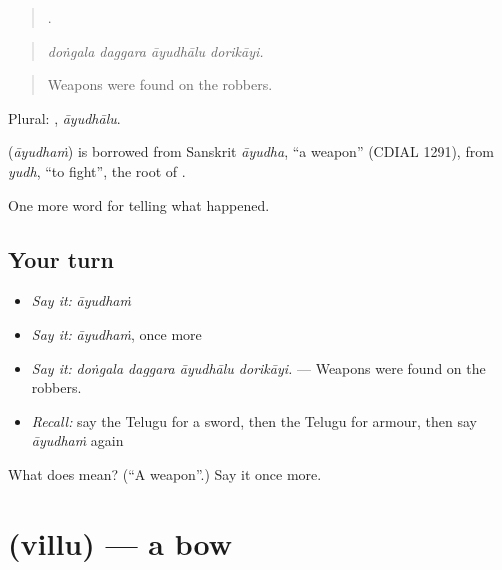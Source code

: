 \begin{quote}
   .
\end{quote}

\begin{quote}
\emph{doṅgala daggara āyudhālu dorikāyi.}
\end{quote}

\begin{quote}
Weapons were found on the robbers.
\end{quote}

Plural: , \emph{āyudhālu}.

\begin{cousinweb}
\textbf{} (\emph{āyudhaṁ}) is borrowed from Sanskrit \emph{āyudha}, \textquotedblleft{}a weapon\textquotedblright{} (CDIAL 1291), from \emph{yudh}, \textquotedblleft{}to fight\textquotedblright{}, the root of .
\end{cousinweb}

\begin{grammarlens}[title={What you've built}]
One more word for telling what happened.
\end{grammarlens}

\subsection*{Your turn}
\begin{itemize}
\raggedright
  \item \emph{Say it:} \emph{āyudhaṁ}
  \item \emph{Say it:} \emph{āyudhaṁ}, once more
  \item \emph{Say it:} \emph{doṅgala daggara āyudhālu dorikāyi.} — Weapons were found on the robbers.
  \item \emph{Recall:} say the Telugu for a sword, then the Telugu for armour, then say \emph{āyudhaṁ} again
\end{itemize}

\begin{tcolorbox}[breakable,colback=teal!4,colframe=teal!35!black,title={Before you move on}]
What does  mean? (\textquotedblleft{}A weapon\textquotedblright{}.) Say it once more.
\end{tcolorbox}
\section[\texorpdfstring{\te{విల్లు} (villu)}{విల్లు (villu)}]{ (villu) — a bow}

